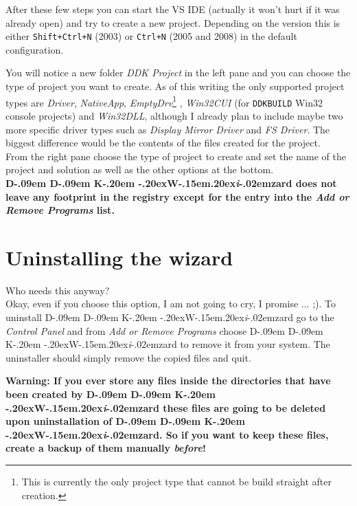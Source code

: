 \documentclass[a4paper,titlepage]{report}
\newcommand{\important}[1]{\textcolor[rgb]{0.90,0.00,0.00}{\textbf{#1}}}
\def\ddkwiz{D\kern-.09em D\kern-.09em K\kern-.20em \raise-.20ex\hbox{W}\kern-.15em\raise.20ex\hbox{\it{i}}\kern-.02em{zard}}
\begin{document}
After these few steps you can start the VS IDE (actually it won't hurt if it
was already open) and try to create a new project. Depending on the version
this is either \texttt{Shift+Ctrl+N} (2003) or \texttt{Ctrl+N} (2005 and 2008)
in the default configuration.

You will notice a new folder \emph{DDK Project} in the left pane and you
can choose the type of project you want to create. As of this writing the
only supported project types are \emph{Driver}, \emph{NativeApp}, \emph{EmptyDrv}\footnote{This
is currently the only project type that cannot be build straight after creation.}
, \emph{Win32CUI} (for \texttt{DDKBUILD} Win32 console projects) and \emph{Win32DLL},
although I already plan to include maybe two more specific driver types such
as \emph{Display Mirror Driver} and \emph{FS Driver}. The biggest difference would
be the contents of the files created for the project.\\

From the right pane choose the type of project to create and set the name
of the project and solution as well as the other options at the bottom.\\

\important{\ddkwiz{} does not leave any footprint in the registry except for
the entry into the \emph{Add or Remove Programs} list.}

\section{Uninstalling the wizard}
Who needs this anyway?\\

Okay, even if you choose this option, I am not going to cry, I promise ... \textsf{;)}. To
uninstall \ddkwiz{} go to the \emph{Control Panel} and from \emph{Add or Remove Programs}
choose \ddkwiz{} to remove it from your system. The uninstaller should simply
remove the copied files and quit.

\important{Warning: If you ever store any files inside the directories that
have been created by \ddkwiz{} these files are going to be deleted upon
uninstallation of \ddkwiz{}. So if you want to keep these files, create a backup
of them manually \emph{before}!}
\end{document}
